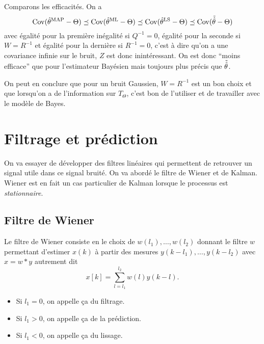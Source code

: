 Comparons les efficacités. On a
\[ \operatorname{Cov}(\hat{\theta}^{\mathrm{MAP}}-\Theta) \preceq \operatorname{Cov}(\hat{\theta}^{\mathrm{ML}}-\Theta) \preceq \operatorname{Cov}(\hat{\theta}^{\mathrm{LS}}-\Theta) \preceq \operatorname{Cov}(\tilde{\hat{\theta}}-\Theta) \]
avec égalité pour la première inégalité si $Q^{-1} = 0$,
égalité pour la seconde si $W = R^{-1}$
et égalité pour la dernière si $R^{-1} = 0$,
c'est à dire qu'on a une covariance infinie sur le bruit,
$Z$ est donc inintéressant.
On est donc ``moins efficace'' que pour l'estimateur Bayésien
mais toujours plus précis que $\tilde{\hat{\theta}}$.

On peut en conclure que pour un bruit Gaussien, $W = R^{-1}$
est un bon choix et que lorsqu'on a de l'information sur $T_\Theta$,
c'est bon de l'utiliser et de travailler avec le modèle de Bayes.

\section{Filtrage et prédiction}
On va essayer de développer des filtres linéaires qui permettent de
retrouver un signal utile dans ce signal bruité.
On va abordé le filtre de Wiener et de Kalman.
Wiener est en fait un cas particulier de Kalman lorsque
le processus est \emph{stationnaire}. %

\subsection{Filtre de Wiener}
Le filtre de Wiener consiste en le choix de $w(l_1), \ldots, w(l_2)$
donnant le filtre $w$ permettant d'estimer $x(k)$ à partir des
mesures $y(k-l_1), \ldots, y(k-l_2)$ avec $x = w * y$ autrement dit
\[ x[k] = \sum_{l=l_1}^{l_2} w(l)y(k-l). \]

\begin{itemize}
  \item Si $l_1 = 0$, on appelle ça du filtrage.
  \item Si $l_1 > 0$, on appelle ça de la prédiction.
  \item Si $l_1 < 0$, on appelle ça du lissage.
\end{itemize}

